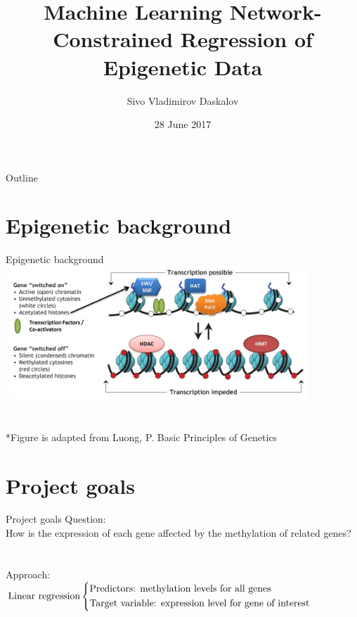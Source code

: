 \documentclass{beamer}
\title{Machine Learning Network-Constrained Regression of Epigenetic Data}
\author{Sivo Vladimirov Daskalov}
\institute{Corpus Christi College}
\date{28 June 2017}
\begin{document}
	
\begin{frame}
	\titlepage
\end{frame}

\begin{frame}{Outline}
  \tableofcontents
\end{frame}





\section{Epigenetic background}
\begin{frame}{Epigenetic background}
\includegraphics[width=11.5cm,height=5cm]{epigenetic_background_slide}\\
~\\~\\
\tiny{*Figure is adapted from Luong, P. Basic Principles of Genetics}
\end{frame}





\section{Project goals}
\begin{frame}{Project goals}
Question:\\
How is the expression of each gene affected by the methylation of related genes?
\\~\\~\\
Approach:\\
$\text{Linear regression}
\begin{dcases}
\text{Predictors: methylation levels for all genes}\\
\text{Target variable: expression level for gene of interest}
\end{dcases}$
\end{frame}
\end{document}
